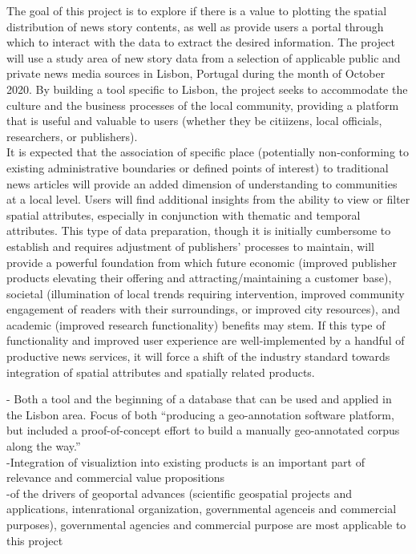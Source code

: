 The goal of this project is to explore if there is a value to plotting the spatial distribution of news story contents, as well as provide users a portal through which to interact with the data to extract the desired information.  The project will use a study area of new story data from a selection of applicable public and private news media sources in Lisbon, Portugal during the month of October 2020. By building a tool specific to Lisbon, the project seeks to accommodate the culture and the business processes of the local community, providing a platform that is useful and valuable to users (whether they be citiizens, local officials, researchers, or publishers).\\

It is expected that the association of specific place (potentially non-conforming to existing administrative boundaries or defined points of interest) to traditional news articles will provide an added dimension of understanding to communities at a local level. Users will find additional insights from the ability to view or filter spatial attributes, especially in conjunction with thematic and temporal attributes. This type of data preparation, though it is initially cumbersome to establish and requires adjustment of publishers' processes to maintain, will provide a powerful foundation from which future economic (improved publisher products elevating their offering and attracting/maintaining a customer base), societal (illumination of local trends requiring intervention, improved community engagement of readers with their surroundings, or improved city resources), and academic (improved research functionality) benefits may stem.  If this type of functionality and improved user experience are well-implemented by a handful of productive news services, it will force a shift of the industry standard towards integration of spatial attributes and spatially related products.

-{\color{purple} Both a tool and the beginning of a database that can be used and applied in the Lisbon area.}{\color{orange} Focus of both “producing a geo-annotation software platform, but included a proof-of-concept effort to build a manually geo-annotated corpus along the way.”\cite{Karimzadeh2019}}\\
-{\color{purple}Integration of visualiztion into existing products is an important part of relevance and commercial value propositions\cite{Meeks2019}}\\
-{\color{purple}of the drivers of geoportal advances (scientific geospatial projects and applications, intenrational organization, governmental agenceis and commercial purposes), governmental agencies and commercial purpose are most applicable to this project\cite{Jiang2020}}\\

